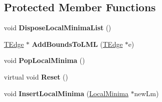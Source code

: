 \subsection*{Protected Member Functions}
\begin{DoxyCompactItemize}
\item 
\hypertarget{class_clipper_lib_1_1_clipper_base_a311dbbec1454ab7965e363a0359f5ee4}{void {\bfseries Dispose\+Local\+Minima\+List} ()}\label{class_clipper_lib_1_1_clipper_base_a311dbbec1454ab7965e363a0359f5ee4}

\item 
\hypertarget{class_clipper_lib_1_1_clipper_base_a2e70686545484c6767dead34d9673ebe}{\hyperlink{struct_clipper_lib_1_1_t_edge}{T\+Edge} $\ast$ {\bfseries Add\+Bounds\+To\+L\+M\+L} (\hyperlink{struct_clipper_lib_1_1_t_edge}{T\+Edge} $\ast$e)}\label{class_clipper_lib_1_1_clipper_base_a2e70686545484c6767dead34d9673ebe}

\item 
\hypertarget{class_clipper_lib_1_1_clipper_base_a9554e9f2273c39e0f5f07d3cd73533e6}{void {\bfseries Pop\+Local\+Minima} ()}\label{class_clipper_lib_1_1_clipper_base_a9554e9f2273c39e0f5f07d3cd73533e6}

\item 
\hypertarget{class_clipper_lib_1_1_clipper_base_a125febb065f23fc55dafffe8d185b642}{virtual void {\bfseries Reset} ()}\label{class_clipper_lib_1_1_clipper_base_a125febb065f23fc55dafffe8d185b642}

\item 
\hypertarget{class_clipper_lib_1_1_clipper_base_aa62506f423172bccd6de8a645cc29cff}{void {\bfseries Insert\+Local\+Minima} (\hyperlink{struct_clipper_lib_1_1_local_minima}{Local\+Minima} $\ast$new\+Lm)}\label{class_clipper_lib_1_1_clipper_base_aa62506f423172bccd6de8a645cc29cff}

\end{DoxyCompactItemize}
